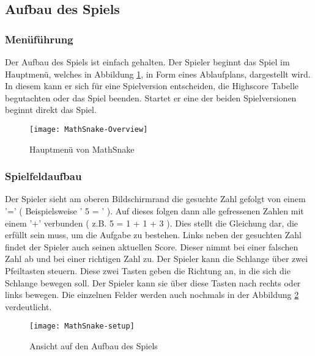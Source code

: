 \subsection{Aufbau des Spiels}
\subsubsection{Menüführung}
Der Aufbau des Spiels ist einfach gehalten. Der Spieler beginnt das Spiel im Hauptmenü, welches in Abbildung \ref{fig:mathsnake-menu}, in Form eines Ablaufplans, dargestellt wird. In diesem kann er sich für eine Spielversion entscheiden, die Highscore Tabelle begutachten oder das Spiel beenden. Startet er eine der beiden Spielversionen beginnt direkt das Spiel. 
\begin{figure}[htb]
	\centering
	\texttt{[image: MathSnake-Overview]}
	\caption{Hauptmenü von MathSnake\label{fig:mathsnake-menu}}
\end{figure}
\subsubsection{Spielfeldaufbau}
Der Spieler sieht am oberen Bildschirmrand die gesuchte Zahl gefolgt von einem '=' ( Beispielsweise ' 5 = ' ). Auf dieses folgen dann alle gefressenen Zahlen mit einem '+' verbunden ( z.B. 5 = 1 + 1 + 3 ). Dies stellt die Gleichung dar, die erfüllt sein muss, um die Aufgabe zu bestehen. Links neben der gesuchten Zahl findet der Spieler auch seinen aktuellen Score. Dieser nimmt bei einer falschen Zahl ab und bei einer richtigen Zahl zu. Der Spieler kann die Schlange über zwei Pfeiltasten steuern. Diese zwei Tasten geben die Richtung an, in die sich die Schlange bewegen soll. Der Spieler kann sie über diese Tasten nach rechts oder links bewegen. Die einzelnen Felder werden auch nochmals in der Abbildung \ref{fig:mathsnake-setup} verdeutlicht.
\begin{figure}[h!tb]
	\centering
	\texttt{[image: MathSnake-setup]}
	\caption{Ansicht auf den Aufbau des Spiels\label{fig:mathsnake-setup}}
\end{figure}
